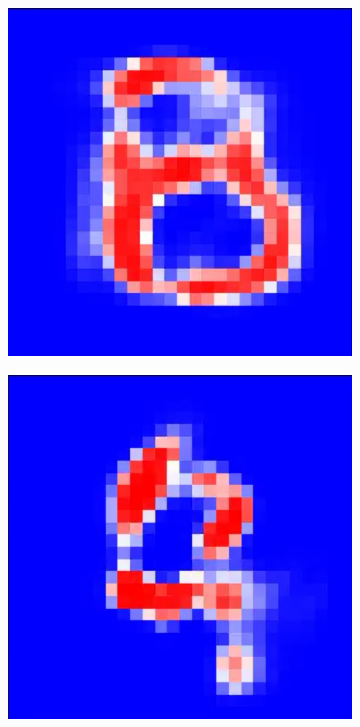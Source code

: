 \documentclass[a4paper]{article}
\begin{document}
\begin{figure}[ht]
  \begin{subfigure}[b]{0.095\textwidth}
   \includegraphics[width=\linewidth]{figures/0.png}
  \end{subfigure}
    \begin{subfigure}[b]{0.095\textwidth}
   \includegraphics[width=\linewidth]{figures/1.png}

\end{subfigure}
\end{figure}
\end{document}
